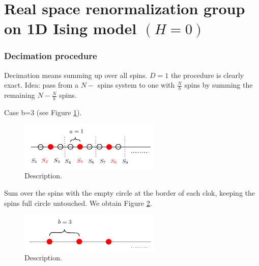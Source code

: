 \documentclass[../main/main.tex]{subfiles}
\begin{document}
\section{Real space renormalization group on 1D Ising model \( (H=0) \)}
\subsubsection{Decimation procedure}
Decimation means summing up over all spins.
\( D=1 \) the procedure is clearly exact. Idea: pass from a \( N- \) spins system to one with \( \frac{N}{b} \) spins by summing the remaining \( N- \frac{N}{b} \) spins.


Case b=3 (see Figure \ref{fig:20_1}).

\begin{figure}[h!]
\centering
\includegraphics[width=0.6\textwidth]{../lessons/20_image/1.pdf}
\caption{\label{fig:20_1} Description.}
\end{figure}

Sum over the spins with the empty circle at the border of each clok, keeping the spins full circle untouched.
We obtain Figure \ref{fig:20_2}.

\begin{figure}[h!]
\centering
\includegraphics[width=0.6\textwidth]{../lessons/20_image/2.pdf}
\caption{\label{fig:20_2} Description.}
\end{figure}
\end{document}
